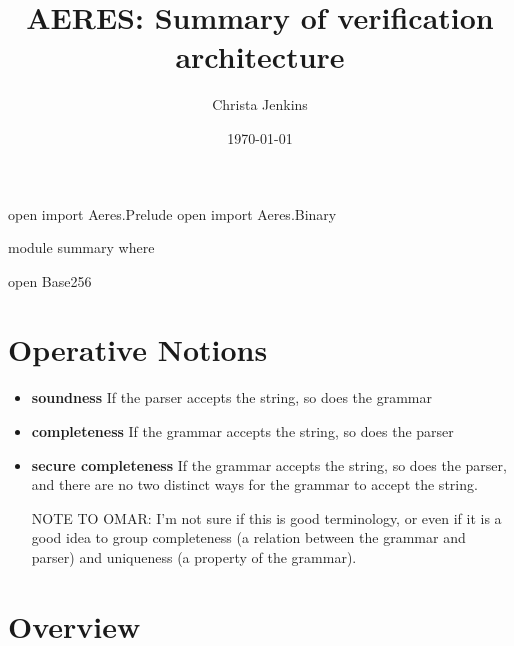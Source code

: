 \documentclass[11pt]{article}
\author{Christa Jenkins}
\date{\today}
\title{AERES: Summary of verification architecture}
\begin{document}
\maketitle
\begin{code}[hide]
open import Aeres.Prelude
open import Aeres.Binary

module summary where

open Base256
\end{code}


\section{Operative Notions}
\label{sec:orgf55f06f}

\begin{itemize}
\item \textbf{soundness} If the parser accepts the string, so does the grammar

\item \textbf{completeness} If the grammar accepts the string, so does the parser

\item \textbf{secure completeness} If the grammar accepts the string, so does the parser,
and there are no two distinct ways for the grammar to accept the string.

NOTE TO OMAR: I'm not sure if this is good terminology, or even if it is a
good idea to group completeness (a relation between the grammar and parser)
and uniqueness (a property of the grammar).
\end{itemize}

\section{Overview}
\label{sec:orgbea5f27}
\end{document}
